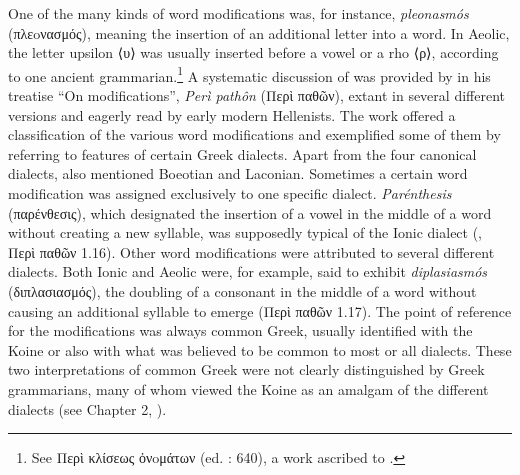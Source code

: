 One of the many kinds of word modifications was, for instance, \textit{pleonasmós} (πλεoνασμός), meaning the insertion of an additional letter into a word. In Aeolic, the letter upsilon ⟨υ⟩ was usually inserted before a vowel or a rho ⟨ρ⟩, according to one ancient grammarian.\footnote{{See Περὶ κλίσεως ὀνoμάτων (ed. \citealt{Lentz1870}: 640), a work ascribed to .}} A systematic discussion of  was provided by  in his treatise “On modifications”, \textit{Perì pathôn} (Περὶ παθῶν), extant in several different versions and eagerly read by early modern Hellenists. The work offered a classification of the various word modifications and exemplified some of them by referring to features of certain Greek dialects. Apart from the four canonical dialects,  also mentioned Boeotian and Laconian. Sometimes a certain word modification was assigned exclusively to one specific dialect. \textit{Parénthesis} (παρένθεσις), which designated the insertion of a vowel in the middle of a word without creating a new syllable, was supposedly typical of the Ionic dialect (, Περὶ παθῶν 1.16). Other word modifications were attributed to several different dialects. Both Ionic and Aeolic were, for example, said to exhibit \textit{diplasiasmós} (διπλασιασμός), the doubling of a consonant in the middle of a word without causing an additional syllable to emerge (Περὶ παθῶν 1.17). The point of reference for the modifications was always common Greek, usually identified with the Koine or also with what was believed to be common to most or all dialects. These two interpretations of common Greek were not clearly distinguished by Greek grammarians, many of whom viewed the Koine as an amalgam of the different dialects (see Chapter 2, ).



